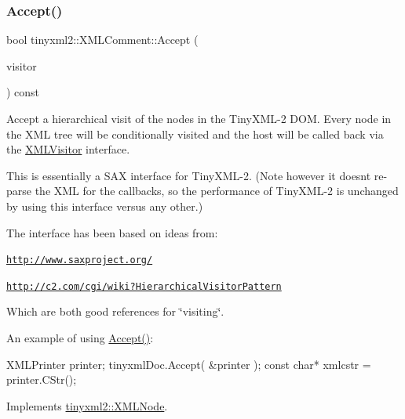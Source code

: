 \subsubsection{\texorpdfstring{Accept()}{Accept()}}
{\footnotesize\ttfamily bool tinyxml2\+::\+X\+M\+L\+Comment\+::\+Accept (\begin{DoxyParamCaption}\item[{\mbox{\hyperlink{classtinyxml2_1_1_x_m_l_visitor}{X\+M\+L\+Visitor}} $\ast$}]{visitor }\end{DoxyParamCaption}) const\hspace{0.3cm}{\ttfamily [virtual]}}

Accept a hierarchical visit of the nodes in the Tiny\+X\+M\+L-\/2 D\+OM. Every node in the X\+ML tree will be conditionally visited and the host will be called back via the \mbox{\hyperlink{classtinyxml2_1_1_x_m_l_visitor}{X\+M\+L\+Visitor}} interface.

This is essentially a S\+AX interface for Tiny\+X\+M\+L-\/2. (Note however it doesn\textquotesingle{}t re-\/parse the X\+ML for the callbacks, so the performance of Tiny\+X\+M\+L-\/2 is unchanged by using this interface versus any other.)

The interface has been based on ideas from\+:


\begin{DoxyItemize}
\item \href{http://www.saxproject.org/}{\tt http\+://www.\+saxproject.\+org/}
\item \href{http://c2.com/cgi/wiki?HierarchicalVisitorPattern}{\tt http\+://c2.\+com/cgi/wiki?\+Hierarchical\+Visitor\+Pattern}
\end{DoxyItemize}

Which are both good references for \char`\"{}visiting\char`\"{}.

An example of using \mbox{\hyperlink{classtinyxml2_1_1_x_m_l_comment_a27b37d16cea01b5329dfbbb4f9508e39}{Accept()}}\+: \begin{DoxyVerb}XMLPrinter printer;
tinyxmlDoc.Accept( &printer );
const char* xmlcstr = printer.CStr();
\end{DoxyVerb}
 

Implements \mbox{\hyperlink{classtinyxml2_1_1_x_m_l_node_a81e66df0a44c67a7af17f3b77a152785}{tinyxml2\+::\+X\+M\+L\+Node}}.

\mbox{\label{classtinyxml2_1_1_x_m_l_comment_adf5b5c0319351dcc339df098d11e8fb2}} 

